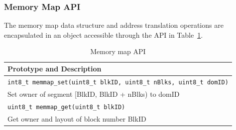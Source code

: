 \subsubsection{Memory Map API}
%
The memory map data structure and address translation operations are
encapsulated in an object accessible through the API
in Table~\ref{tab:memmap_api}. 	
%
%
%
%
%
\begin{table}[htdp]
   \centering
   \small{
   \begin{tabular}{|l|}
   \hline
   Prototype and Description \\
   \hline
   \texttt{int8\_t memmap\_set(uint8\_t blkID, uint8\_t nBlks, uint8\_t
   domID)}\\
   Set owner of segment [BlkID, BlkID + nBlks) to domID \\
   \hline
   \texttt{uint8\_t memmap\_get(uint8\_t blkID)}\\
   Get owner and layout of block number BlkID \\
   \hline
   \end{tabular}
   }
   \centering
   \caption{Memory map API}
   \label{tab:memmap_api}
\end{table}
%
%
